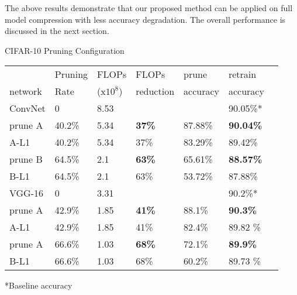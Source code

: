 \documentclass{article} %
\begin{document}
The above results demonstrate that our proposed method can be applied on full model compression with less accuracy degradation. 
The overall performance is discussed in the next section.
\caption{CIFAR-10 Pruning Configuration}
\centering
\begin{tabular}{lllllll}
\toprule
         &    Pruning    & FLOPs    & FLOPs          & prune    & retrain        \\
network  &    Rate       & (x$10^{8}$)  & reduction      & accuracy & accuracy       \\ \midrule
ConvNet  &           0   &  8.53      &                &          &  90.05\%*        \\
prune A  &        40.2\% &  5.34      &  \textbf{37\%}     & 87.88\%  &  \textbf{90.04\%}\\
A-L1     &        40.2\% &  5.34      &  37\%          & 83.29\%  &  89.42\%         \\
prune B  &        64.5\% &  2.1       &  \textbf{63\%}     & 65.61\%  &  \textbf{88.57\%}\\
B-L1    &        64.5\% &  2.1       &  63\%          & 53.72\%  &  87.88\%         \\ \bottomrule
VGG-16   &           0   &  3.31      &                &          &  90.2\%*         \\
prune A &        42.9\% &  1.85        &  \textbf{41\%}     &  88.1\%  &  \textbf{90.3\%} \\
A-L1     &        42.9\% &  1.85      &   41\%         &  82.4\%  &  89.82  \%       \\
prune A  &        66.6\% &  1.03        &  \textbf{68\%}     &  72.1\%  &  \textbf{89.9\%} \\
B-L1    &        66.6\% &  1.03      &   68\%         &  60.2\%  &  89.73   \%      \\ \bottomrule
\end{tabular}
\label{tab:CIFAR-10}
\caption*{\hspace{-65mm}\footnotesize{*Baseline accuracy}}
\vspace{-6mm}
\end{document}
